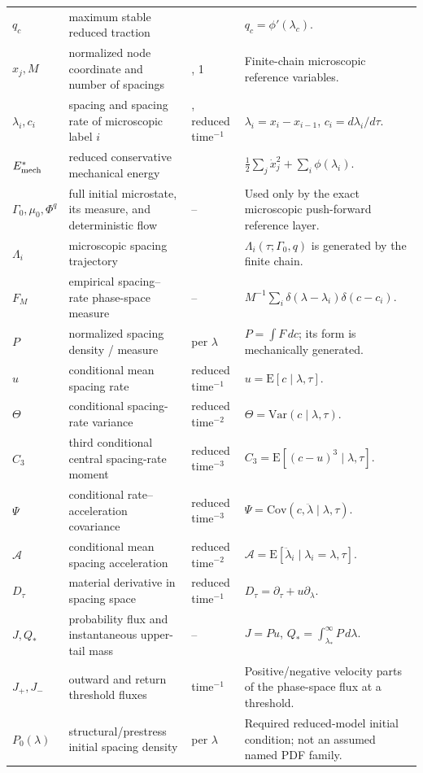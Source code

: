 \begin{longtable}{>{\raggedright\arraybackslash}p{}>{\raggedright\arraybackslash}p{}>{\raggedright\arraybackslash}p{}>{\raggedright\arraybackslash}p{}}
$q_c$ & maximum stable reduced traction & 1 & $q_c=\phi'(\lambda_c)$. \\
$x_j,M$ & normalized node coordinate and number of spacings & 1, 1 & Finite-chain microscopic reference variables. \\
$\lambda_i,c_i$ & spacing and spacing rate of microscopic label $i$ & 1, reduced time$^{-1}$ & $\lambda_i=x_i-x_{i-1}$, $c_i=d\lambda_i/d\tau$. \\
$E_{\rm mech}^*$ & reduced conservative mechanical energy & 1 & $\frac12\sum_j\dot x_j^2+\sum_i\phi(\lambda_i)$. \\
$\Gamma_0,\mu_0,\Phi^q$ & full initial microstate, its measure, and deterministic flow & -- & Used only by the exact microscopic push-forward reference layer. \\
$\Lambda_i$ & microscopic spacing trajectory & 1 & $\Lambda_i(\tau;\Gamma_0,q)$ is generated by the finite chain. \\
$F_M$ & empirical spacing--rate phase-space measure & -- & $M^{-1}\sum_i\delta(\lambda-\lambda_i)\delta(c-c_i)$. \\
$P$ & normalized spacing density / measure & 1 per $\lambda$ & $P=\int F\,dc$; its form is mechanically generated. \\
$u$ & conditional mean spacing rate & reduced time$^{-1}$ & $u=\mathrm E[c\mid\lambda,\tau]$. \\
$\Theta$ & conditional spacing-rate variance & reduced time$^{-2}$ & $\Theta=\mathrm{Var}(c\mid\lambda,\tau)$. \\
$C_3$ & third conditional central spacing-rate moment & reduced time$^{-3}$ & $C_3=\mathrm E[(c-u)^3\mid\lambda,\tau]$. \\
$\Psi$ & conditional rate--acceleration covariance & reduced time$^{-3}$ & $\Psi=\mathrm{Cov}(c,\ddot\lambda\mid\lambda,\tau)$. \\
$\mathcal A$ & conditional mean spacing acceleration & reduced time$^{-2}$ & $\mathcal A=\mathrm E[\ddot\lambda_i\mid\lambda_i=\lambda,\tau]$. \\
$D_\tau$ & material derivative in spacing space & reduced time$^{-1}$ & $D_\tau=\partial_\tau+u\partial_\lambda$. \\
$J,Q_*$ & probability flux and instantaneous upper-tail mass & -- & $J=Pu$, $Q_*=\int_{\lambda_*}^{\infty}P\,d\lambda$. \\
$J_+,J_-$ & outward and return threshold fluxes & time$^{-1}$ & Positive/negative velocity parts of the phase-space flux at a threshold. \\
$P_0(\lambda)$ & structural/prestress initial spacing density & 1 per $\lambda$ & Required reduced-model initial condition; not an assumed named PDF family. \\

\end{longtable}
